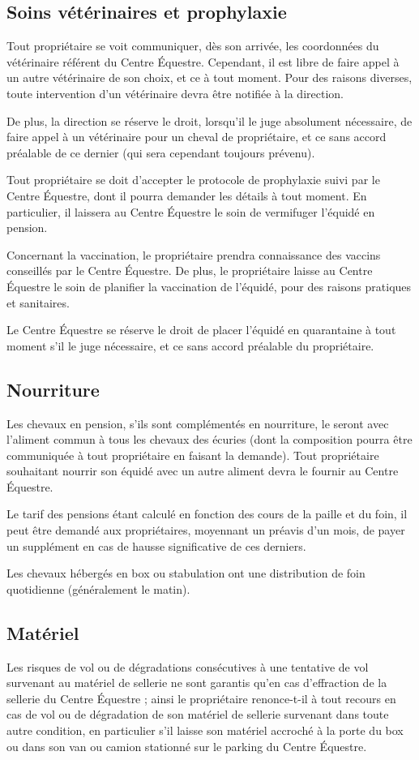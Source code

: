 \documentclass[11pt,a4paper]{article}
\begin{document}
\subsection*{Soins vétérinaires et prophylaxie}
Tout propriétaire se voit communiquer, dès son arrivée, les coordonnées du vétérinaire référent du Centre Équestre. Cependant, il est libre de faire appel à un autre vétérinaire de son choix, et ce à tout moment. Pour des raisons diverses, toute intervention d'un vétérinaire devra être notifiée à la direction.

De plus, la direction se réserve le droit, lorsqu'il le juge absolument nécessaire, de faire appel à un vétérinaire pour un cheval de propriétaire, et ce sans accord préalable de ce dernier (qui sera cependant toujours prévenu).

Tout propriétaire se doit d'accepter le protocole de prophylaxie suivi par le Centre Équestre, dont il pourra demander les détails à tout moment. En particulier, il laissera au Centre Équestre le soin de vermifuger l'équidé en pension.

Concernant la vaccination, le propriétaire prendra connaissance des vaccins conseillés par le Centre Équestre. De plus, le propriétaire laisse au Centre Équestre le soin de planifier la vaccination de l'équidé, pour des raisons pratiques et sanitaires.

Le Centre Équestre se réserve le droit de placer l'équidé en quarantaine à tout moment s'il le juge nécessaire, et ce sans accord préalable du propriétaire.

\subsection*{Nourriture}
Les chevaux en pension, s'ils sont complémentés en nourriture, le seront avec l'aliment commun à tous les chevaux des écuries (dont la composition pourra être communiquée à tout propriétaire en faisant la demande). Tout propriétaire souhaitant nourrir son équidé avec un autre aliment devra le fournir au Centre Équestre.

Le tarif des pensions étant calculé en fonction des cours de la paille et du foin, il peut être demandé aux propriétaires, moyennant un préavis d'un mois, de payer un supplément en cas de hausse significative de ces derniers.

Les chevaux hébergés en box ou stabulation ont une distribution de foin quotidienne (généralement le matin).

\subsection*{Matériel}
Les risques de vol ou de dégradations consécutives à une tentative de vol survenant au matériel de sellerie ne sont garantis qu'en cas d'effraction de la sellerie du Centre Équestre ; ainsi le propriétaire renonce-t-il à tout recours en cas de vol ou de dégradation de son matériel de sellerie survenant dans toute autre condition, en particulier s'il laisse son matériel accroché à la porte du box ou dans son van ou camion stationné sur le parking du Centre Équestre.
\end{document}
